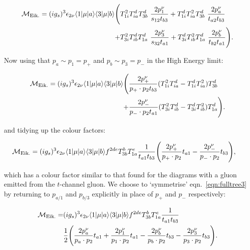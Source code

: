 	\begin{align}
	\begin{split}
	    \mathcal{M}_{\text{Eik.}} = (ig_s)^3 \epsilon_{2\nu} \langle 1 | \mu | a \rangle \langle 3 | \mu | b \rangle \Bigg(
	     &T^2_{1i}T^d_{ia}T^d_{3b}\ \frac{2p_1^\nu}{s_{12}t_{b3}}
	    + T^d_{1i}T^2_{ia}T^d_{3b}\ \frac{2p_a^\nu}{t_{a2}t_{b3}} \\
	    +&T^2_{3i}T^d_{ib}T^d_{1a}\ \frac{2p_3^\nu}{s_{32}t_{a1}}
	    + T^d_{3i}T^2_{ib}T^d_{1a}\ \frac{2p_b^\nu}{t_{b2}t_{a1}}\Bigg).
		\label{eq:fulltree2}
	\end{split}
	\end{align}

	Now using that $p_a\sim p_1=p_+$ and $p_b\sim p_3=p_-$ in the High Energy limit:

	\begin{align}
	\begin{split}
		\mathcal{M}_{\text{Eik.}} = (ig_s)^3 \epsilon_{2\nu} \langle 1 | \mu | a \rangle \langle 3 | \mu | b \rangle \Bigg(&
		\frac{2p_+^\nu}{p_+\cdot p_2 t_{b3}}(T^2_{1i}T^d_{ia} - T^d_{1i}T^2_{ia})T^d_{3b}\\
		+ &\frac{2p_-^\nu}{p_-\cdot p_2 t_{a1}}(T^2_{3i}T^d_{ib} - T^d_{3i}T^2_{ib})T^d_{1a}\Bigg).\\
	\end{split}
	\end{align}

	and tidying up the colour factors:

	\begin{align}
	\begin{split}
		\mathcal{M}_{\text{Eik.}} = (ig_s)^3 \epsilon_{2\nu} \langle 1 | \mu | a \rangle \langle 3 | \mu | b \rangle
		f^{2de}T^b_{3b}T^e_{1a}\frac{1}{t_{a1}t_{b3}}\Bigg(&
		\frac{2p_+^\nu}{p_+\cdot p_2}t_{a1} - \frac{2p_-^\nu}{p_-\cdot p_2}t_{b3}\Bigg),
		\label{eqn:fulltree3}
	\end{split}
	\end{align}

	which has a colour factor similar to that found for the diagrams with a gluon emitted from the
	$t$-channel gluon.  We choose to `symmetrise' eqn.~\eqref{eqn:fulltree3} by returning to $p_{a/1}$
	and $p_{b/3}$ explicitly in place of $p_+$ and $p_-$ respectively:

	\begin{align}
	\begin{split}
		\mathcal{M}_{\text{Eik.}} = &(ig_s)^3 \epsilon_{2\nu} \langle 1 | \mu | a \rangle \langle 3 | \mu | b \rangle f^{2de}T^b_{3b}T^e_{1a}\frac{1}{t_{a1}t_{b3}}\\
		&\frac{1}{2}\Bigg(\frac{2p_a^\nu}{p_a\cdot p_2}t_{a1} + \frac{2p_1^\nu}{p_1\cdot p_2}t_{a1} -
		\frac{2p_b^\nu}{p_b\cdot p_2}t_{b3} - \frac{2p_3^\nu}{p_3\cdot p_2}t_{b3}\Bigg).
		\label{eq:fulltree4}
	\end{split}
	\end{align}

